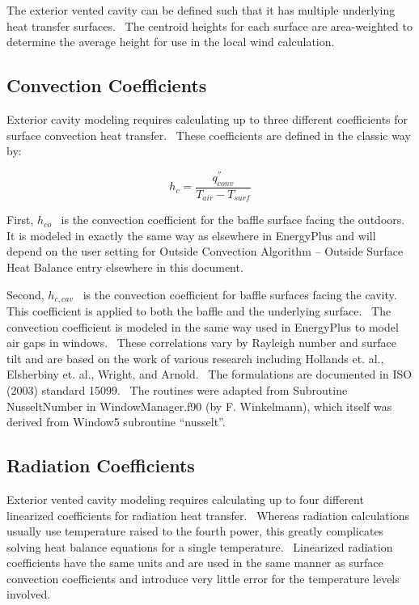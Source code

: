 The exterior vented cavity can be defined such that it has multiple underlying heat transfer surfaces.~ The centroid heights for each surface are area-weighted to determine the average height for use in the local wind calculation.

\subsection{Convection Coefficients}\label{convection-coefficients}

Exterior cavity modeling requires calculating up to three different coefficients for surface convection heat transfer.~ These coefficients are defined in the classic way by:

\begin{equation}
{h_c} = \frac{q^{''}_{conv}}{T_{air} - T_{surf}}
\end{equation}

First, \({h_{co}}\) ~is the convection coefficient for the baffle surface facing the outdoors.~ It is modeled in exactly the same way as elsewhere in EnergyPlus and will depend on the user setting for Outside Convection Algorithm -- Outside Surface Heat Balance entry elsewhere in this document.

Second, \({h_{c,cav}}\) ~is the convection coefficient for baffle surfaces facing the cavity.~ This coefficient is applied to both the baffle and the underlying surface.~ The convection coefficient is modeled in the same way used in EnergyPlus to model air gaps in windows.~ These correlations vary by Rayleigh number and surface tilt and are based on the work of various research including Hollands et. al., Elsherbiny et. al., Wright, and Arnold.~ The formulations are documented in ISO (2003) standard 15099.~ The routines were adapted from Subroutine NusseltNumber in WindowManager.f90 (by F. Winkelmann), which itself was derived from Window5 subroutine ``nusselt''.

\subsection{Radiation Coefficients}\label{radiation-coefficients}

Exterior vented cavity modeling requires calculating up to four different linearized coefficients for radiation heat transfer.~ Whereas radiation calculations usually use temperature raised to the fourth power, this greatly complicates solving heat balance equations for a single temperature.~ Linearized radiation coefficients have the same units and are used in the same manner as surface convection coefficients and introduce very little error for the temperature levels involved.

